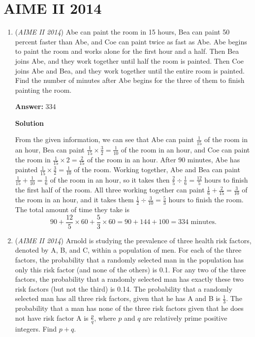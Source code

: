 \section{AIME II 2014}
        \begin{enumerate}
        	\item (\textit{AIME II 2014}) Abe can paint the room in 15 hours, Bea can paint 50 percent faster than Abe, and Coe can paint twice as fast as Abe. Abe begins to paint the room and works alone for the first hour and a half. Then Bea joins Abe, and they work together until half the room is painted. Then Coe joins Abe and Bea, and they work together until the entire room is painted. Find the number of minutes after Abe begins for the three of them to finish painting the room.


 
 \textbf{Answer: }334



\textbf{Solution}

From the given information, we can see that Abe can paint $\frac{1}{15}$ of the room in an hour, Bea can paint $\frac{1}{15}\times\frac{3}{2} = \frac{1}{10}$ of the room in an hour, and Coe can paint the room in $\frac{1}{15}\times 2 = \frac{2}{15}$ of the room in an hour.  After $90$ minutes, Abe has painted $\frac{1}{15}\times\frac{3}{2}=\frac{1}{10}$ of the room.  Working together, Abe and Bea can paint $\frac{1}{15}+\frac{1}{10}=\frac{1}{6}$ of the room in an hour, so it takes then $\frac{2}{5}\div \frac{1}{6}= \frac{12}{5}$ hours to finish the first half of the room.  All three working together can paint $\frac{1}{6}+\frac{2}{15}=\frac{3}{10}$ of the room in an hour, and it takes them $\frac{1}{2}\div \frac{3}{10}=\frac{5}{3}$ hours to finish the room.  The total amount of time they take is
 \[90+\frac{12}{5}\times 60+\frac{5}{3}\times 60 = 90+ 144 + 100 = \boxed{334} \text{\ minutes.}\]



	\item (\textit{AIME II 2014}) Arnold is studying the prevalence of three health risk factors, denoted by A, B, and C, within a population of men. For each of the three factors, the probability that a randomly selected man in the population has only this risk factor (and none of the others) is 0.1. For any two of the three factors, the probability that a randomly selected man has exactly these two risk factors (but not the third) is 0.14. The probability that a randomly selected man has all three risk factors, given that he has A and B is $\frac{1}{3}$. The probability that a man has none of the three risk factors given that he does not have risk factor A is $\frac{p}{q}$, where $p$ and $q$ are relatively prime positive integers. Find $p+q$. 



\end{enumerate}
